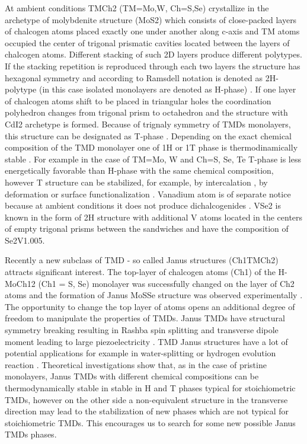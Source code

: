 \documentclass[a4paperm]{article}
\begin{document}
At ambient conditions TMCh2 (TM=Mo,W, Ch=S,Se) crystallize in the archetype of molybdenite structure (MoS2) which consists of close-packed layers of chalcogen atoms placed exactly one under another along c-axis and TM atoms occupied the center of trigonal prismatic cavities located between the layers of chalcogen atoms. Different stacking of such 2D layers produce different polytypes. If the stacking repetition is reproduced through each two layers the structure has hexagonal symmetry and according to Ramsdell notation is denoted as 2H-polytype (in this case isolated monolayers are denoted as H-phase) \cite{huang2020recent}. If one layer of chalcogen atoms shift to be placed in triangular holes the coordination polyhedron changes from trigonal prism to octahedron and the structure with CdI2 archetype is formed. Because of trignaly symmetry of TMDs monolayers, this structure can be designated as T-phase \cite{huang2020recent}. Depending on the exact chemical composition of the TMD monolayer one of 1H or 1T phase is thermodinamically stable \cite{ataca2012stable}. For example in the case of TM=Mo, W and Ch=S, Se, Te T-phase is less energetically favorable than H-phase with the same chemical composition, however T structure can be stabilized, for example, by intercalation \cite{kan2014structures, wang2014atomic}, by deformation \cite{duerloo2014structural} or surface functionalization \cite{tang2015stabilization, voiry2015covalent}. Vanadium atom is of separate notice because at ambient conditions it does not produce dichalcogenides \cite{murphy1977preparation, le1979elaboration}. VSe2 is known in the form of 2H structure with additional V atoms located in the centers of empty trigonal prisms between the sandwiches and have the composition of Se2V1.005.


Recently a new subclass of TMD - so called Janus structures (Ch1TMCh2) attracts significant interest. The top-layer of chalcogen atoms (Ch1) of the H-MoCh12 (Ch1 = S, Se) monolayer was successfully changed on the layer of Ch2 atoms and the formation of Janus MoSSe structure was observed experimentally \cite{lu2017, zhang2017janus}. The opportunity to change the top layer of atoms opens an additional degree of freedom to manipulate the properties of TMDs. Janus TMDs have structural symmetry breaking \cite{li2017electronic, van2020first} resulting in Rashba spin splitting \cite{hu2018intrinsic} and transverse dipole moment leading to large piezoelectricity \cite{dong2017large, li2018recent}. TMD Janus structures have a lot of potential applications for example in water-splitting \cite{xia2018universality, ma2018janus} or hydrogen evolution reaction \cite{er2018prediction, zhou2019janus}. Theoretical investigations show that, as in the case of pristine monolayers, Janus TMDs with different chemical compositions can be thermodynamically stable in stable in H and T phases typical for stoichiometric TMDs, however on the other side a non-equivalent structure in the transverse direction may lead to the stabilization of new phases which are not typical for stoichiometric TMDs. This encourages us to search for some new possible Janus TMDs phases.
\end{document}
